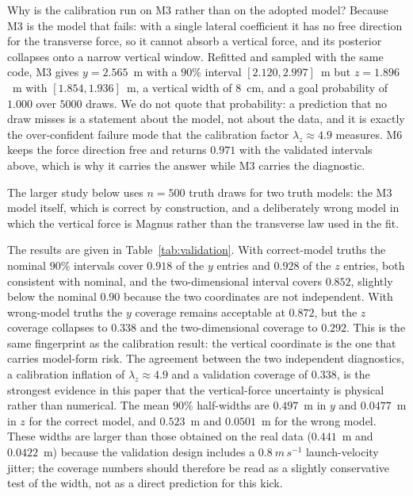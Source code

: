 Why is the calibration run on M3 rather than on the adopted model? Because M3 is
the model that fails: with a single lateral coefficient it has no free direction
for the transverse force, so it cannot absorb a vertical force, and its
posterior collapses onto a narrow vertical window. Refitted and sampled with the
same code, M3 gives $y=2.565$~m with a $90\%$ interval $[2.120,2.997]$~m but
$z=1.896$~m with $[1.854,1.936]$~m, a vertical width of $8$~cm, and a goal
probability of $1.000$ over $5000$ draws. We do not quote that probability: a
prediction that no draw misses is a statement about the model, not about the
data, and it is exactly the over-confident failure mode that the calibration
factor $\lambda_z\approx4.9$ measures. M6 keeps the force direction free and
returns $0.971$ with the validated intervals above, which is why it carries the
answer while M3 carries the diagnostic.

The larger study below uses $n=500$ truth draws for two truth models: the M3
model itself, which is correct by construction, and a deliberately wrong model in
which the vertical force is Magnus rather than the transverse law used in the
fit.

The results are given in Table~\ref{tab:validation}. With correct-model truths the
nominal $90\%$ intervals cover $0.918$ of the $y$ entries and $0.928$ of the $z$
entries, both consistent with nominal, and the two-dimensional interval covers
$0.852$, slightly below the nominal $0.90$ because the two coordinates are not
independent. With wrong-model truths the $y$ coverage remains acceptable at
$0.872$, but the $z$ coverage collapses to $0.338$ and the two-dimensional
coverage to $0.292$. This is the same fingerprint as the calibration result:
the vertical coordinate is the one that carries model-form risk. The agreement
between the two independent diagnostics, a calibration inflation of
$\lambda_z\approx4.9$ and a validation coverage of $0.338$, is the strongest
evidence in this paper that the vertical-force uncertainty is physical rather
than numerical. The mean $90\%$ half-widths are $0.497$~m in $y$ and
$0.0477$~m in $z$ for the correct model, and $0.523$~m and $0.0501$~m for the
wrong model. These widths are larger than those obtained on the real data
($0.441$~m and $0.0422$~m) because the validation design includes a
$0.8~\si{m\,s^{-1}}$ launch-velocity jitter; the coverage numbers should
therefore be read as a slightly conservative test of the width, not as a direct
prediction for this kick.

